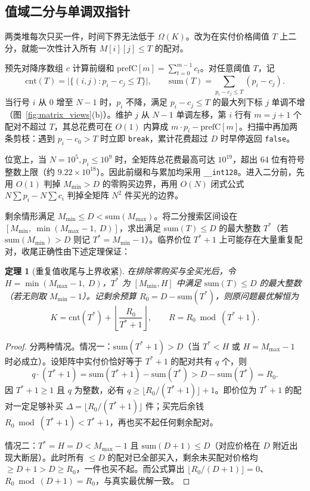 \documentclass[12pt,a4paper,fontset=windows]{ctexart}
\theoremstyle{plain}
\newtheorem{theorem}{定理}
\newcommand{\code}[1]{\texttt{#1}}
\begin{document}
\subsection{值域二分与单调双指针}

两类堆每次只买一件，时间下界无法低于 $\Omega(K)$。改为在实付价格阈值 $T$ 上二分，就能一次性计入所有 $M[i][j] \le T$ 的配对。

预先对降序数组 $c$ 计算前缀和 $\mathrm{prefC}[m] = \sum_{t=0}^{m-1} c_t$。对任意阈值 $T$，记
\[
\mathrm{cnt}(T) = \big|\{(i,j) : p_i - c_j \le T\}\big|, \qquad
\mathrm{sum}(T) = \sum_{p_i - c_j \le T} (p_i - c_j).
\]
当行号 $i$ 从 $0$ 增至 $N-1$ 时，$p_i$ 不降，满足 $p_i - c_j \le T$ 的最大列下标 $j$ 单调不增（图~\ref{fig:matrix_views}(b)）。维护 $j$ 从 $N-1$ 单调左移，第 $i$ 行有 $m = j+1$ 个配对不超过 $T$，其总花费可在 $O(1)$ 内算成 $m \cdot p_i - \mathrm{prefC}[m]$。扫描中再加两条剪枝：遇到 $p_i - c_0 > T$ 时立即 \code{break}，累计花费超过 $D$ 时早停返回 \code{false}。

位宽上，当 $N=10^5, p_i \le 10^9$ 时，全矩阵总花费最高可达 $10^{19}$，超出 64 位有符号整数上限（约 $9.22 \times 10^{18}$）。因此前缀和与累加均采用 \code{\_\_int128}。进入二分前，先用 $O(1)$ 判掉 $M_{\min} > D$ 的零购买边界，再用 $O(N)$ 闭式公式 $N\sum p_i - N\sum c_i$ 判掉全矩阵 $N^2$ 件买光的边界。

剩余情形满足 $M_{\min} \le D < \mathrm{sum}(M_{\max})$。将二分搜索区间设在 $[M_{\min},\ \min(M_{\max}-1,\ D)]$，求出满足 $\mathrm{sum}(T) \le D$ 的最大整数 $T^*$（若 $\mathrm{sum}(M_{\min}) > D$ 则记 $T^* = M_{\min}-1$）。临界价位 $T^*+1$ 上可能存在大量重复配对，收尾正确性由下述定理保证：

\begin{theorem}[重复值收尾与上界收紧]
在排除零购买与全买光后，令 $H = \min(M_{\max}-1,\ D)$，$T^*$ 为 $[M_{\min}, H]$ 中满足 $\mathrm{sum}(T) \le D$ 的最大整数（若无则取 $M_{\min}-1$）。记剩余预算 $R_0 = D - \mathrm{sum}(T^*)$，则原问题最优解恒为
\[
K = \mathrm{cnt}(T^*) + \left\lfloor \frac{R_0}{T^* + 1} \right\rfloor, \qquad
R = R_0 \bmod (T^* + 1).
\]
\end{theorem}

\begin{proof}
分两种情况。情况一：$\mathrm{sum}(T^* + 1) > D$（当 $T^* < H$ 或 $H = M_{\max}-1$ 时必成立）。设矩阵中实付价恰好等于 $T^*+1$ 的配对共有 $q$ 个，则
\[
q \cdot (T^* + 1) = \mathrm{sum}(T^* + 1) - \mathrm{sum}(T^*) > D - \mathrm{sum}(T^*) = R_0.
\]
因 $T^*+1 \ge 1$ 且 $q$ 为整数，必有 $q \ge \lfloor R_0 / (T^*+1) \rfloor + 1$。即价位为 $T^*+1$ 的配对一定足够补买 $\Delta = \lfloor R_0/(T^*+1) \rfloor$ 件；买完后余钱 $R_0 \bmod (T^*+1) < T^*+1$，再也买不起任何剩余配对。

情况二：$T^* = H = D < M_{\max}-1$ 且 $\mathrm{sum}(D+1) \le D$（对应价格在 $D$ 附近出现大断层）。此时所有 $\le D$ 的配对已全部买入，剩余未买配对价格均 $\ge D+1 > D \ge R_0$，一件也买不起。而公式算出 $\lfloor R_0/(D+1) \rfloor = 0$、$R_0 \bmod (D+1) = R_0$，与真实最优解一致。
\end{proof}
\end{document}
